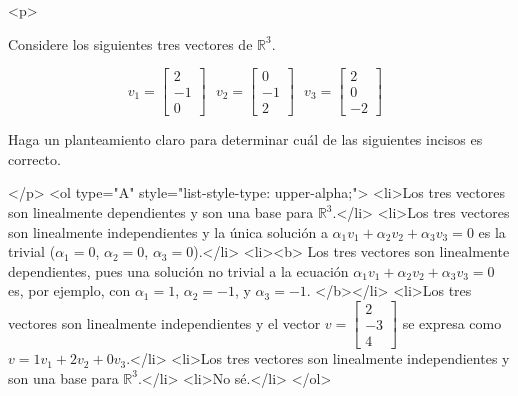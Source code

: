 
<p>

    Considere los siguientes tres vectores de $\mathbb{R}^3$.

    $$
    v_1=\begin{bmatrix} 2 \\ -1 \\ 0 \end{bmatrix} \ \ \ 
    v_2=\begin{bmatrix} 0 \\ -1 \\ 2 \end{bmatrix} \ \ \ 
    v_3=\begin{bmatrix} 2 \\ 0 \\ -2 \end{bmatrix} \ \ \ 
    $$

    Haga un planteamiento claro para determinar cuál de las siguientes incisos es correcto.
    
</p>
<ol type="A" style="list-style-type: upper-alpha;">
    <li>Los tres vectores son linealmente dependientes y son una base para $\mathbb{R}^3$.</li>
<li>Los tres vectores son linealmente independientes y la única solución a $\alpha_1v_1+\alpha_2v_2+\alpha_3v_3=0$ es la trivial ($\alpha_1=0$, $\alpha_2=0$, $\alpha_3=0$).</li>
<li><b>
    Los tres vectores son linealmente dependientes, pues una solución no trivial a la ecuación $\alpha_1v_1+\alpha_2v_2+\alpha_3v_3=0$ es, por ejemplo, con $\alpha_1=1$, $\alpha_2=-1$, y $\alpha_3=-1$.
    </b></li>
<li>Los tres vectores son linealmente independientes y el vector $v=\begin{bmatrix} 2 \\ -3 \\ 4 \end{bmatrix}$ se expresa como $v=1v_1+2v_2+0v_3$.</li>
<li>Los tres vectores son linealmente independientes y son una base para $\mathbb{R}^3$.</li>
<li>No sé.</li>
</ol>
